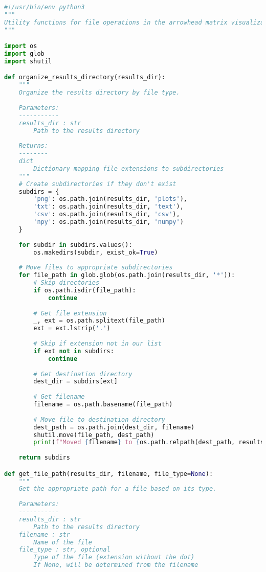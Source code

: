 \begin{lstlisting}[language=Python]
#!/usr/bin/env python3
"""
Utility functions for file operations in the arrowhead matrix visualization.
"""

import os
import glob
import shutil

def organize_results_directory(results_dir):
    """
    Organize the results directory by file type.
    
    Parameters:
    -----------
    results_dir : str
        Path to the results directory
    
    Returns:
    --------
    dict
        Dictionary mapping file extensions to subdirectories
    """
    # Create subdirectories if they don't exist
    subdirs = {
        'png': os.path.join(results_dir, 'plots'),
        'txt': os.path.join(results_dir, 'text'),
        'csv': os.path.join(results_dir, 'csv'),
        'npy': os.path.join(results_dir, 'numpy')
    }
    
    for subdir in subdirs.values():
        os.makedirs(subdir, exist_ok=True)
    
    # Move files to appropriate subdirectories
    for file_path in glob.glob(os.path.join(results_dir, '*')):
        # Skip directories
        if os.path.isdir(file_path):
            continue
        
        # Get file extension
        _, ext = os.path.splitext(file_path)
        ext = ext.lstrip('.')
        
        # Skip if extension not in our list
        if ext not in subdirs:
            continue
        
        # Get destination directory
        dest_dir = subdirs[ext]
        
        # Get filename
        filename = os.path.basename(file_path)
        
        # Move file to destination directory
        dest_path = os.path.join(dest_dir, filename)
        shutil.move(file_path, dest_path)
        print(f"Moved {filename} to {os.path.relpath(dest_path, results_dir)}")
    
    return subdirs

def get_file_path(results_dir, filename, file_type=None):
    """
    Get the appropriate path for a file based on its type.
    
    Parameters:
    -----------
    results_dir : str
        Path to the results directory
    filename : str
        Name of the file
    file_type : str, optional
        Type of the file (extension without the dot)
        If None, will be determined from the filename
    

\end{lstlisting}
